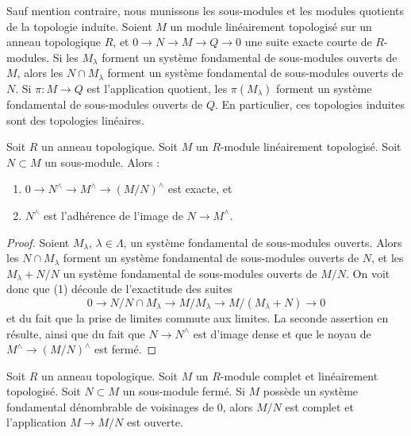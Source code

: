 \noindent
Sauf mention contraire, nous munissons les sous-modules et les modules quotients
de la topologie induite. Soient $M$ un module linéairement topologisé
sur un anneau topologique $R$, et $0 \to N \to M \to Q \to 0$
une suite exacte courte de $R$-modules. Si les $M_\lambda$ forment un
système fondamental de sous-modules ouverts de $M$, alors
les $N \cap M_\lambda$ forment un système fondamental de sous-modules ouverts de $N$.
Si $\pi : M \to Q$ est l'application quotient, les $\pi(M_\lambda)$ forment un
système fondamental de sous-modules ouverts de $Q$. En particulier, ces topologies
induites sont des topologies linéaires.

\begin{lemma}
\label{lemma-closure}
Soit $R$ un anneau topologique. Soit $M$ un $R$-module linéairement
topologisé. Soit $N \subset M$ un sous-module. Alors :
\begin{enumerate}
\item $0 \to N^\wedge \to M^\wedge \to (M/N)^\wedge$ est exacte, et
\item $N^\wedge$ est l'adhérence de l'image de $N \to M^\wedge$.
\end{enumerate}
\end{lemma}

\begin{proof}
Soient $M_\lambda$, $\lambda \in \Lambda$, un système fondamental de
sous-modules ouverts. Alors les $N \cap M_\lambda$ forment un système fondamental
de sous-modules ouverts de $N$, et les $M_\lambda + N/N$ un système fondamental
de sous-modules ouverts de $M/N$. On voit donc que (1) découle de
l'exactitude des suites
$$
0 \to N/N \cap M_\lambda \to M/M_\lambda \to M/(M_\lambda + N) \to 0
$$
et du fait que la prise de limites commute aux limites. La seconde
assertion en résulte, ainsi que du fait que $N \to N^\wedge$
est d'image dense et que le noyau de $M^\wedge \to (M/N)^\wedge$ est fermé.
\end{proof}

\begin{lemma}
\label{lemma-quotient-by-closed}
Soit $R$ un anneau topologique. Soit $M$ un $R$-module complet et linéairement
topologisé. Soit $N \subset M$ un sous-module fermé. Si $M$ possède un
système fondamental dénombrable de voisinages de $0$, alors
$M/N$ est complet et l'application $M \to M/N$ est ouverte.
\end{lemma}

